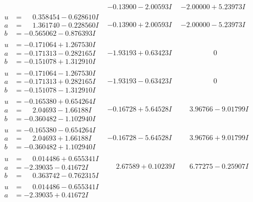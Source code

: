 \documentclass[1p]{elsarticle_modified}
\theoremstyle{definition}
\begin{document}
$$\begin{array}{c|c|c}
 & -0.13900 - 2.00593 I & -2.00000 + 5.23973 I \\ \hline\begin{aligned}
u &= \phantom{-}0.358454 - 0.628610 I \\
a &= \phantom{-}1.361740 - 0.228560 I \\
b &= -0.565062 - 0.876393 I\end{aligned}
 & -0.13900 + 2.00593 I & -2.00000 - 5.23973 I \\ \hline\begin{aligned}
u &= -0.171064 + 1.267530 I \\
a &= -0.171313 - 0.282165 I \\
b &= -0.151078 + 1.312910 I\end{aligned}
 & -1.93193 + 0.63423 I & \phantom{-0.000000 } 0 \\ \hline\begin{aligned}
u &= -0.171064 - 1.267530 I \\
a &= -0.171313 + 0.282165 I \\
b &= -0.151078 - 1.312910 I\end{aligned}
 & -1.93193 - 0.63423 I & \phantom{-0.000000 } 0 \\ \hline\begin{aligned}
u &= -0.165380 + 0.654264 I \\
a &= \phantom{-}2.04693 - 1.66188 I \\
b &= -0.360482 - 1.102940 I\end{aligned}
 & -0.16728 + 5.64528 I & \phantom{-}3.96766 - 9.01799 I \\ \hline\begin{aligned}
u &= -0.165380 - 0.654264 I \\
a &= \phantom{-}2.04693 + 1.66188 I \\
b &= -0.360482 + 1.102940 I\end{aligned}
 & -0.16728 - 5.64528 I & \phantom{-}3.96766 + 9.01799 I \\ \hline\begin{aligned}
u &= \phantom{-}0.014486 + 0.655341 I \\
a &= -2.39035 - 0.41672 I \\
b &= \phantom{-}0.363742 - 0.762315 I\end{aligned}
 & \phantom{-}2.67589 + 0.10239 I & \phantom{-}6.77275 - 0.25907 I \\ \hline\begin{aligned}
u &= \phantom{-}0.014486 - 0.655341 I \\
a &= -2.39035 + 0.41672 I \\

\end{aligned}
\end{array}$$
\end{document}
